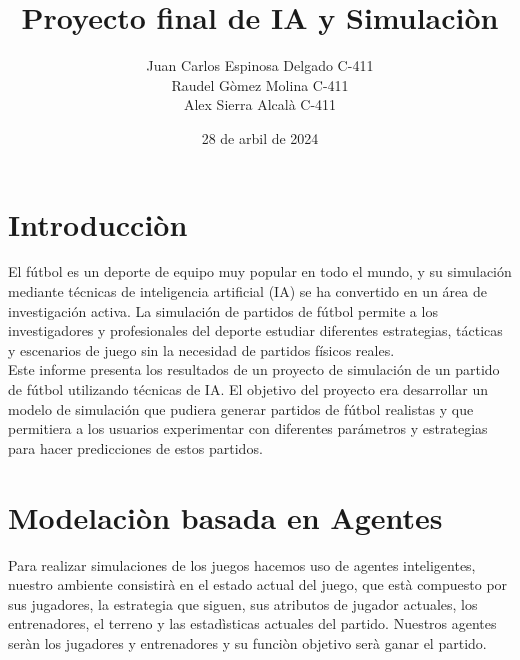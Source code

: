 \documentclass{article}
\title{Proyecto final de IA y Simulaciòn}
\author{Juan Carlos Espinosa Delgado C-411 \\
        Raudel Gòmez Molina C-411\\
        Alex Sierra Alcalà C-411
}
\date{28 de arbil de 2024}
\begin{document}
\maketitle
\newpage

\tableofcontents
\newpage

\section{Introducciòn}
    El fútbol es un deporte de equipo muy popular en todo el mundo, y su simulación mediante técnicas de inteligencia artificial (IA) se ha convertido en un área de investigación activa. La simulación de partidos de fútbol permite a los investigadores y profesionales del deporte estudiar diferentes estrategias, tácticas y escenarios de juego sin la necesidad de partidos físicos reales.\\
    Este informe presenta los resultados de un proyecto de simulación de un partido de fútbol utilizando técnicas de IA. El objetivo del proyecto era desarrollar un modelo de simulación que pudiera generar partidos de fútbol realistas y que permitiera a los usuarios experimentar con diferentes parámetros y estrategias para hacer predicciones de estos partidos.
\newpage
\section{Modelaciòn basada en Agentes}
    Para realizar simulaciones de los juegos hacemos uso de agentes inteligentes, nuestro
ambiente consistirà en el estado actual del juego, que està compuesto por sus jugadores, la
estrategia que siguen, sus atributos de jugador actuales, los entrenadores, el terreno y las estadìsticas actuales del partido.
Nuestros agentes seràn los jugadores y entrenadores y su funciòn objetivo serà ganar el partido.
    
\end{document}
